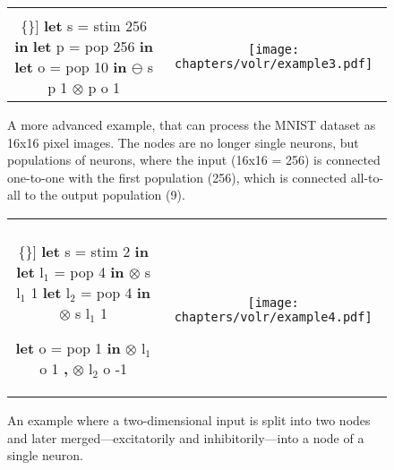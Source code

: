\begin{figure}
  \ContinuedFloat
  \begin{tabular}[t]{c c}
    \begin{minipage}{0.4\textwidth}
      \begin{Verbatim}[mathescape,commandchars=\\\{\}]
\textbf{let} s = stim 256 \textbf{in}
  \textbf{let} p = pop 256 \textbf{in}
    \textbf{let} o = pop 10 \textbf{in}
      $\ominus$ s p 1
      $\otimes$ p o 1
      \end{Verbatim}
    \end{minipage} & \begin{minipage}{0.6\textwidth}
      \texttt{[image: chapters/volr/example3.pdf]}
    \end{minipage}
  \end{tabular}
  \caption{A more advanced example, that can process the MNIST dataset
    as 16x16 pixel images. 
    The nodes are no longer single neurons, but populations of neurons,
    where the input (16x16 = 256) is connected one-to-one
    with the first population (256), which is connected all-to-all to the 
    output population (9).}
\end{figure}

\begin{figure}
  \ContinuedFloat
  \begin{tabular}[t]{c c}
    \begin{minipage}{0.45\textwidth}
      \begin{Verbatim}[mathescape,commandchars=\\\{\}]
\textbf{let} s = stim 2 \textbf{in}
\textbf{let} l$_1$ = pop 4 \textbf{in} $\otimes$ s l$_1$ 1
\textbf{let} l$_2$ = pop 4 \textbf{in} $\otimes$ s l$_1$ 1

\textbf{let} o = pop 1 \textbf{in} 
  $\otimes$ l$_1$ o 1 \textbf{,} $\otimes$ l$_2$ o -1
      \end{Verbatim}
    \end{minipage} & \begin{minipage}{0.55\textwidth}
       \texttt{[image: chapters/volr/example4.pdf]}
    \end{minipage}
  \end{tabular}
   \caption{An example where a two-dimensional input is split into
     two nodes and later merged---excitatorily and inhibitorily---into 
     a node of a single neuron.}
  \label{fig:volr-example}
\end{figure}
